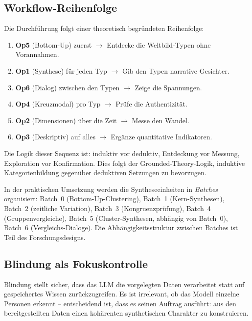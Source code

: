 \documentclass[11pt,a4paper]{article}
\theoremstyle{definition}
\theoremstyle{plain}
\theoremstyle{remark}
\begin{document}
\subsection{Workflow-Reihenfolge}
\label{sec:workflow}

Die Durchf\"uhrung folgt einer theoretisch begr\"undeten Reihenfolge:

\begin{enumerate}[leftmargin=*]
  \item \textbf{Op5} (Bottom-Up) zuerst $\rightarrow$ Entdecke die Weltbild-Typen ohne Vorannahmen.
  \item \textbf{Op1} (Synthese) f\"ur jeden Typ $\rightarrow$ Gib den Typen narrative Gesichter.
  \item \textbf{Op6} (Dialog) zwischen den Typen $\rightarrow$ Zeige die Spannungen.
  \item \textbf{Op4} (Kreuzmodal) pro Typ $\rightarrow$ Pr\"ufe die Authentizit\"at.
  \item \textbf{Op2} (Dimensionen) \"uber die Zeit $\rightarrow$ Messe den Wandel.
  \item \textbf{Op3} (Deskriptiv) auf alles $\rightarrow$ Erg\"anze quantitative Indikatoren.
\end{enumerate}

Die Logik dieser Sequenz ist: induktiv vor deduktiv, Entdeckung vor Messung, Exploration vor Konfirmation. Dies folgt der Grounded-Theory-Logik, induktive Kategorienbildung gegen\"uber deduktiven Setzungen zu bevorzugen.

In der praktischen Umsetzung werden die Syntheseeinheiten in \emph{Batches} organisiert: Batch~0 (Bottom-Up-Clustering), Batch~1 (Kern-Synthesen), Batch~2 (zeitliche Variation), Batch~3 (Kongruenzpr\"ufung), Batch~4 (Gruppenvergleiche), Batch~5 (Cluster-Synthesen, abh\"angig von Batch~0), Batch~6 (Vergleichs-Dialoge). Die Abh\"angigkeitsstruktur zwischen Batches ist Teil des Forschungsdesigns.


\subsection{Blindung als Fokuskontrolle}
\label{sec:blindung}

Blindung stellt sicher, dass das LLM die vorgelegten Daten verarbeitet statt auf gespeichertes Wissen zur\"uckzugreifen. Es ist irrelevant, ob das Modell einzelne Personen erkennt -- entscheidend ist, dass es seinen Auftrag ausf\"uhrt: aus den bereitgestellten Daten einen koh\"arenten synthetischen Charakter zu konstruieren.
\end{document}
